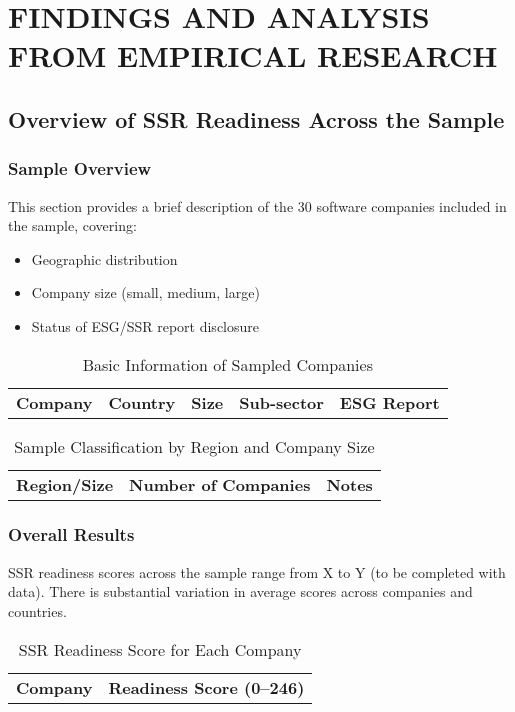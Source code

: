 \chapter{FINDINGS AND ANALYSIS FROM EMPIRICAL RESEARCH}

\section{Overview of SSR Readiness Across the Sample}
\subsection{Sample Overview}
This section provides a brief description of the 30 software companies included in the sample, covering:
\begin{itemize}
    \item Geographic distribution
    \item Company size (small, medium, large)
    \item Status of ESG/SSR report disclosure
\end{itemize}

\begin{table}[H]
    \centering
    \caption{Basic Information of Sampled Companies}
    \begin{tabular}{l l l l l}
        \textbf{Company} & \textbf{Country} & \textbf{Size} & \textbf{Sub-sector} & \textbf{ESG Report} \\
    \end{tabular}
\end{table}

\begin{table}[H]
    \centering
    \caption{Sample Classification by Region and Company Size}
    \begin{tabular}{l l l}
        \textbf{Region/Size} & \textbf{Number of Companies} & \textbf{Notes} \\
    \end{tabular}
\end{table}

\subsection{Overall Results}
SSR readiness scores across the sample range from X to Y (to be completed with data). There is substantial variation in average scores across companies and countries.

\begin{table}[H]
    \centering
    \caption{SSR Readiness Score for Each Company}
    \begin{tabular}{l l}
        \textbf{Company} & \textbf{Readiness Score (0--246)} \\
    \end{tabular}
\end{table}


